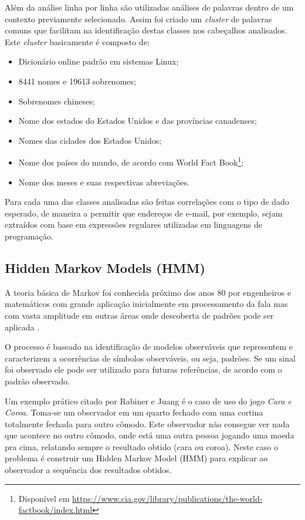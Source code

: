 Além da análise linha por linha são utilizadas análises de palavras dentro de um contexto previamente selecionado. Assim foi criado um \textit{cluster} de palavras comuns que facilitam na identificação destas classes nos cabeçalhos analisados. Este \textit{cluster} basicamente é composto de:

\begin{itemize}
\item Dicionário online padrão em sistemas Linux;
\item 8441 nomes e 19613 sobrenomes;
\item Sobrenomes chineses;
\item Nome dos estados do Estados Unidos e das províncias canadenses;
\item Nomes das cidades dos Estados Unidos;
\item Nome dos países do mundo, de acordo com World Fact Book\footnote{Disponível em \url{https://www.cia.gov/library/publications/the-world-factbook/index.html}};
\item Nome dos meses e suas respectivas abreviações.
\end{itemize}

Para cada uma das classes analisadas são feitas correlações com o tipo de dado esperado, de maneira a permitir que endereços de e-mail, por exemplo, sejam extraídos com base em expressões regulares utilizadas em linguagens de programação.

\subsection{Hidden Markov Models (HMM)}

A teoria básica de Markov foi conhecida próximo dos anos 80 por engenheiros e matemáticos com grande aplicação inicialmente em processamento da fala mas com vasta amplitude em outras áreas onde descoberta de padrões pode ser aplicada \cite{hmm}.

O processo é baseado na identificação de modelos observáveis que representem e caracterizem a ocorrências de símbolos observáveis, ou seja, padrões. Se um sinal foi observado ele pode ser utilizado para futuras referências, de acordo com o padrão observado.

Um exemplo prático citado por Rabiner e Juang \cite{hmm} é o caso de uso do jogo  \textit{Cara e Coroa}. Toma-se um observador em um quarto fechado com uma cortina totalmente fechada para outro cômodo. Este observador não consegue ver nada que acontece no outro cômodo, onde está uma outra pessoa jogando uma moeda pra cima, relatando sempre o resultado obtido (cara ou coroa). Neste caso o problema é construir um Hidden Markov Model (HMM) para explicar ao observador a sequência dos resultados obtidos. 


